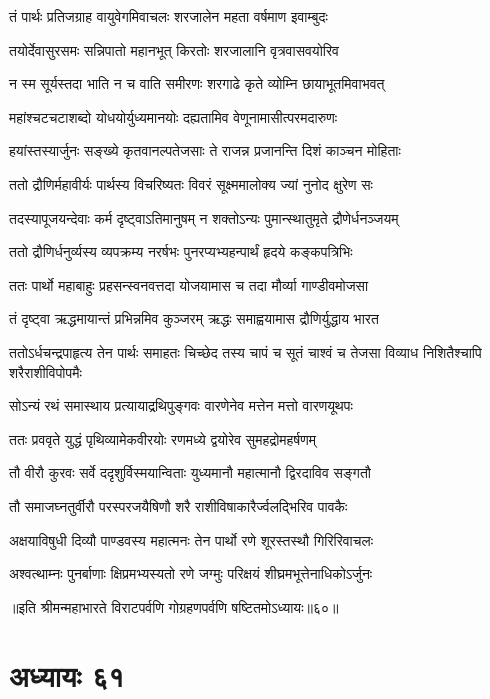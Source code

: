 \twolineshloka
{तं पार्थः प्रतिजग्राह वायुवेगमिवाचलः}
{शरजालेन महता वर्षमाण इवाम्बुदः}


\twolineshloka
{तयोर्देवासुरसमः सन्निपातो महानभूत्}
{किरतोः शरजालानि वृत्रवासवयोरिव}


\twolineshloka
{न स्म सूर्यस्तदा भाति न च वाति समीरणः}
{शरगाढे कृते व्योम्नि छायाभूतमिवाभवत्}


\twolineshloka
{महांश्चटचटाशब्दो योधयोर्युध्यमानयोः}
{दह्यतामिव वेणूनामासीत्परमदारुणः}


\twolineshloka
{हयांस्तस्यार्जुनः सङ्ख्ये कृतवानल्पतेजसाः}
{ते राजन्न प्रजानन्ति दिशं काञ्चन मोहिताः}


\twolineshloka
{ततो द्रौणिर्महावीर्यः पार्थस्य विचरिष्यतः}
{विवरं सूक्ष्ममालोक्य ज्यां नुनोद क्षुरेण सः}


\twolineshloka
{तदस्यापूजयन्देवाः कर्म दृष्ट्वाऽतिमानुषम्}
{न शक्तोऽन्यः पुमान्स्थातुमृते द्रौणेर्धनञ्जयम्}


\twolineshloka
{ततो द्रौणिर्धनुर्व्यस्य व्यपक्रम्य नरर्षभः}
{पुनरप्यभ्यहन्पार्थं हृदये कङ्कपत्रिभिः}



\twolineshloka
{ततः पार्थो महाबाहुः प्रहसन्स्वनवत्तदा}
{योजयामास च तदा मौर्व्या गाण्डीवमोजसा}


\twolineshloka
{तं दृष्ट्वा ऋद्धमायान्तं प्रभिन्नमिव कुञ्जरम्}
{ऋद्धः समाह्वयामास द्रौणिर्युद्धाय भारत}


\threelineshloka
{ततोऽर्धचन्द्रपाहृत्य तेन पार्थः समाहतः}
{चिच्छेद तस्य चापं च सूतं चाश्वं च तेजसा}
{विव्याध निशितैश्चापि शरैराशीविपोपमैः}


\twolineshloka
{सोऽन्यं रथं समास्थाय प्रत्यायाद्रथिपुङ्गवः}
{वारणेनेव मत्तेन मत्तो वारणयूथपः}


\twolineshloka
{ततः प्रववृते युद्धं पृथिव्यामेकवीरयोः}
{रणमध्ये द्वयोरेव सुमहद्रोमहर्षणम्}


\twolineshloka
{तौ वीरौ कुरवः सर्वे ददृशुर्विस्मयान्विताः}
{युध्यमानौ महात्मानौ द्विरदाविव सङ्गतौ}


\twolineshloka
{तौ समाजघ्नतुर्वीरौ परस्परजयैषिणौ}
{शरै राशीविषाकारैर्ज्वलद्भिरिव पावकैः}


\twolineshloka
{अक्षयाविषुधी दिव्यौ पाण्डवस्य महात्मनः}
{तेन पार्थो रणे शूरस्तस्थौ गिरिरिवाचलः}


\twolineshloka
{अश्वत्थाम्नः पुनर्बाणाः क्षिप्रमभ्यस्यतो रणे}
{जग्मुः परिक्षयं शीघ्रमभूत्तेनाधिकोऽर्जुनः}

॥इति श्रीमन्महाभारते विराटपर्वणि गोग्रहणपर्वणि षष्टितमोऽध्यायः॥६०॥

\chapter{अध्यायः ६१}


